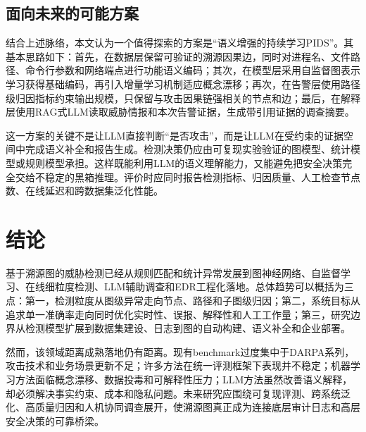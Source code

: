 \subsection{面向未来的可能方案}

结合上述脉络，本文认为一个值得探索的方案是“语义增强的持续学习PIDS”。其基本思路如下：首先，在数据层保留可验证的溯源因果边，同时对进程名、文件路径、命令行参数和网络端点进行功能语义编码；其次，在模型层采用自监督图表示学习获得基础编码，再引入增量学习机制适应概念漂移；再次，在告警层使用路径级归因指标约束输出规模，只保留与攻击因果链强相关的节点和边；最后，在解释层使用RAG式LLM读取威胁情报和本次告警证据，生成带引用证据的调查摘要。

这一方案的关键不是让LLM直接判断“是否攻击”，而是让LLM在受约束的证据空间中完成语义补全和报告生成。检测决策仍应由可复现实验验证的图模型、统计模型或规则模型承担。这样既能利用LLM的语义理解能力，又能避免把安全决策完全交给不稳定的黑箱推理。评价时应同时报告检测指标、归因质量、人工检查节点数、在线延迟和跨数据集泛化性能。

\section{结论}

基于溯源图的威胁检测已经从规则匹配和统计异常发展到图神经网络、自监督学习、在线细粒度检测、LLM辅助调查和EDR工程化落地。总体趋势可以概括为三点：第一，检测粒度从图级异常走向节点、路径和子图级归因；第二，系统目标从追求单一准确率走向同时优化实时性、误报、解释性和人工工作量；第三，研究边界从检测模型扩展到数据集建设、日志到图的自动构建、语义补全和企业部署。

然而，该领域距离成熟落地仍有距离。现有benchmark过度集中于DARPA系列，攻击技术和业务场景更新不足；许多方法在统一评测框架下表现并不稳定；机器学习方法面临概念漂移、数据投毒和可解释性压力；LLM方法虽然改善语义解释，却必须解决事实约束、成本和隐私问题。未来研究应围绕可复现评测、跨系统泛化、高质量归因和人机协同调查展开，使溯源图真正成为连接底层审计日志和高层安全决策的可靠桥梁。
